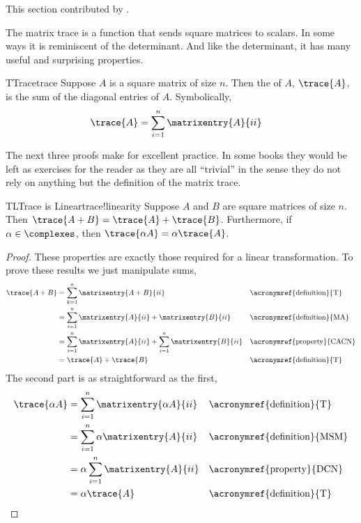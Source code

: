
This section contributed by \andyzimmer.\par\bigskip
%
The matrix trace is a function that sends square matrices to scalars.  In some ways it is reminiscent of the determinant.  And like the determinant, it has many useful and surprising properties.
%
\begin{definition}{T}{Trace}{trace}
Suppose $A$ is a square matrix of size $n$.  Then the  of $A$, $\trace{A}$, is the sum of the diagonal entries of $A$.  Symbolically, 
%
\begin{align*}
\trace{A}
&=\sum_{i=1}^n \matrixentry{A}{ii}
\end{align*}
\end{definition}
%
The next three proofs make for excellent practice.  In some books they would be left as exercises for the reader as they are all ``trivial'' in the sense they do not rely on anything but the definition of the matrix trace.
%
\begin{theorem}{TL}{Trace is Linear}{trace!linearity} 
Suppose $A$ and $B$ are square matrices of size $n$.  Then $\trace{A+B}=\trace{A}+\trace{B}$.  Furthermore, if $\alpha\in\complexes$, then $\trace{\alpha A}=\alpha\trace{A}$.
\end{theorem}
%
\begin{proof}
These properties are exactly those required for a linear transformation.  To prove these results we just manipulate sums,
%
\begin{align*}
\trace{A+B}
&=\sum_{k=1}^n \matrixentry{A+B}{ii}&&\text{\acronymref{definition}{T}}\\
&=\sum_{i=1}^n \matrixentry{A}{ii}+\matrixentry{B}{ii}&&\text{\acronymref{definition}{MA}}\\
&=\sum_{i=1}^n \matrixentry{A}{ii}+\sum_{i=1}^n \matrixentry{B}{ii}&&\text{\acronymref{property}{CACN}}\\
&=\trace{A}+\trace{B}&&\text{\acronymref{definition}{T}}
\end{align*}
%
The second part is as straightforward as the first,
%
\begin{align*}
\trace{\alpha A}
&=\sum_{i=1}^n \matrixentry{\alpha A}{ii}&&\text{\acronymref{definition}{T}}\\
&=\sum_{i=1}^n \alpha \matrixentry{A}{ii}&&\text{\acronymref{definition}{MSM}}\\
&=\alpha \sum_{i=1}^n \matrixentry{A}{ii}&&\text{\acronymref{property}{DCN}}\\
&=\alpha\trace{A}&&\text{\acronymref{definition}{T}}
\end{align*}
%
\end{proof}
